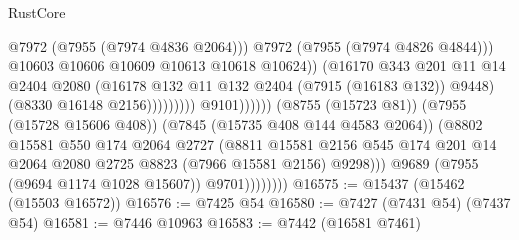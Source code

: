 \begin{lexlean}{RustCore}
\begin{coremodule}
                                                        @7972
                                                        (@7955 (@7974 @4836 @2064)))
                                                      @7972
                                                      (@7955 (@7974 @4826 @4844)))
                                                    @10603
                                                    @10606
                                                    @10609
                                                    @10613
                                                    @10618
                                                    @10624))
                                                (@16170
                                                  @343
                                                  @201
                                                  @11
                                                  @14
                                                  @2404
                                                  @2080
                                                  (@16178
                                                    @132
                                                    @11
                                                    @132
                                                    @2404
                                                    (@7915 (@16183 @132))
                                                    @9448)
                                                  (@8330 @16148 @2156)))))))))
                                  @9101))))))
                      (@8755 (@15723 @81))
                      (@7955 (@15728 @15606 @408))
                      (@7845 (@15735 @408 @144 @4583 @2064))
                      (@8802
                        @15581
                        @550
                        @174
                        @2064
                        @2727
                        (@8811
                          @15581
                          @2156
                          @545
                          @174
                          @201
                          @14
                          @2064
                          @2080
                          @2725
                          @8823
                          (@7966 @15581 @2156)
                          @9298)))
                    @9689
                    (@7955 (@9694 @1174 @1028 @15607))
                    @9701))))))))
@16575 := @15437 (@15462 (@15503 @16572))
@16576 := @7425 @54
@16580 := @7427 (@7431 @54) (@7437 @54)
@16581 := @7446 @10963
@16583 := @7442 (@16581 @7461)

\end{coremodule}
\end{lexlean}
